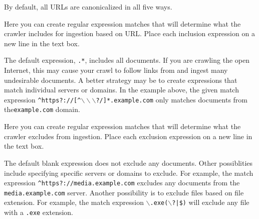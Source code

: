 By default, all URLs are canonicalized in all five ways.



Here you can create regular expression matches that will determine
what the crawler includes for ingestion based on URL.  Place each
inclusion expression on a new line in the text box.

The default expression, \texttt{.*}, includes all documents. If you
are crawling the open Internet, this may cause your crawl to follow
links from and ingest many undesirable documents. A better strategy
may be to create expressions that match individual servers or
domains. In the example above, the given match expression\linebreak
\texttt{\^{}https?://[\^{}$\backslash\backslash\backslash$?/]*.example.com} only matches documents from the\linebreak \texttt{example.com} domain.





Here you can create regular expression matches that will determine
what the crawler excludes from ingestion. Place each exclusion
expression on a new line in the text box.

The default blank expression does not exclude any documents. Other
possiblities include specifying specific servers or domains to
exclude. For example, the match expression
\texttt{\^{}https?://media.example.com} excludes any documents from
the \texttt{media.example.com} server. Another possibility is to
exclude files based on file extension. For example, the match
expression \texttt{$\backslash$.exe($\backslash$?|\$)} will exclude any
file with a \texttt{.exe} extension.





